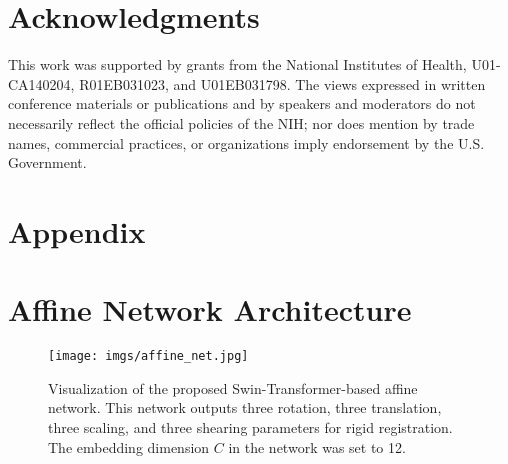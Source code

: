 \documentclass[times,twocolumn,final]{elsarticle}
\begin{document}
\section*{Acknowledgments}
This work was supported by grants from the National Institutes of Health, U01-CA140204, R01EB031023, and U01EB031798. The views expressed in written conference materials or publications and by speakers and moderators do not necessarily reflect the official policies of the NIH; nor does mention by trade names, commercial practices, or organizations imply endorsement by the U.S. Government.
\onecolumn
\appendix
\section*{Appendix}
\section{Affine Network Architecture}
\begin{figure*}[!h]
\centering
\texttt{[image: imgs/affine\_net.jpg]}
\caption{Visualization of the proposed Swin-Transformer-based affine network. This network outputs three rotation, three translation, three scaling, and three shearing parameters for rigid registration. The embedding dimension $C$ in the network was set to 12. \label{fig:affine_arch}}
\end{figure*}
\end{document}
